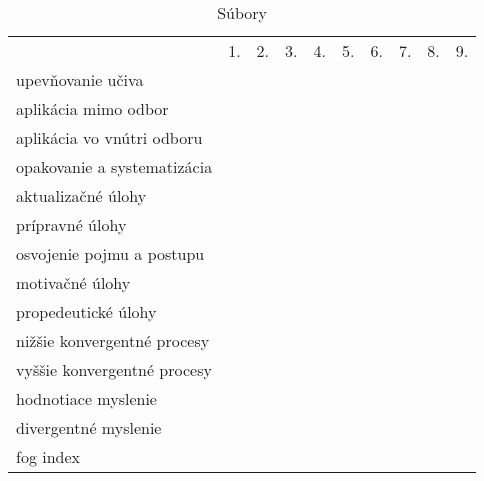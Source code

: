 \begin{table}[h]
\centering
\begin{tabularx}{\textwidth}{|l|Y|Y|Y|Y|Y|Y|Y|Y|Y|}
\hline
{}           & 1. & 2. & 3. & 4. & 5. & 6. & 7. & 8. & 9. \\ \Xhline{4\arrayrulewidth}
upevňovanie učiva       &  &  &  &   &  &  & & &  \\ \hline
aplikácia mimo odbor    &  &  &  &   &  &  & & &  \\ \hline
aplikácia vo vnútri odboru    &  &  &  &   &  &  & & &  \\ \hline
opakovanie a systematizácia   &  &  &  &   &  &  & & & \\ \hline
aktualizačné úlohy            &  &  &  &   &  &  & & & \\ \hline
prípravné úlohy              &  &  &  &   &  &  & & & \\ \hline
osvojenie pojmu a postupu     &  &  &  &   &  &  & & & \\ \hline
motivačné úlohy                    &  &  &  &   &  &  & & &  \\ \hline
propedeutické úlohy                &  &  &  &   &  &  & & & \\ \Xhline{4\arrayrulewidth}
nižšie konvergentné procesy        &  &  &  &   &  &  & & & \\ \hline
vyššie konvergentné procesy        &  &  &  &   &  &  & & & \\ \hline
hodnotiace myslenie                & &  &  &  &   &  &  & & \\ \hline
divergentné myslenie               &  &  &  &   &  &  & & & \\ \Xhline{4\arrayrulewidth}
fog index                          &  &  &  &   &  &  & & & \\ \hline
\end{tabularx}
\caption{Súbory}
\end{table} 
